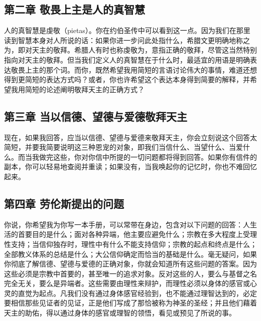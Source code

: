 
\subsection{第二章 敬畏上主是人的真智慧}

人的真智慧是虔敬（pietas）。你在约伯圣传中可以看到这一点。因为我们在那里读到智慧本身对人所说的话：如果你进一步问此处指什么，希腊文更明确地称之为，即对天主的敬拜。希腊人有时也称虔敬为，意指正确的敬拜，尽管这当然特别指向对天主的敬拜。但当我们定义人的真智慧在于什么时，最适宜的用语是明确表达敬畏上主的那个词。而你，既然希望我用简短的言语讨论伟大的事情，难道还想得到更简短的表达方式吗？或者，你也许希望这个表达本身得到简要的解释，并希望我用简短的论述阐明敬拜天主的正确方式？\par


\subsection{第三章 当以信德、望德与爱德敬拜天主}

现在，如果我回答，应当以信德、望德与爱德来敬拜天主，你会立刻说这个回答太简短，并要我简要说明这三种恩宠的对象，即我们当信什么、当望什么、当爱什么。而当我做完这些，你对你信中所提的一切问题都将得到回答。如果你有信件的副本，你可以轻易地查阅并重读；如果没有，当我唤起你的记忆时，你也不难回忆起来。\par


\subsection{第四章 劳伦斯提出的问题}

你说，你希望我为你写一本手册，可以常带在身边，包含对以下问题的回答：人生活的首要目的是什么；面对各种异端，他主要应避免什么；宗教在多大程度上受理性支持；当信仰独存时，理性中有什么不能支持信仰；宗教的起点和终点是什么；全部教义体系的总结是什么；大公信仰确定而恰当的基础是什么。毫无疑问，如果你彻底了解信德、望德与爱德的正确对象，你就会知道所有这些问题的答案。因为这些必须是宗教中首要的，甚至唯一的追求对象。反对这些的人，要么与基督之名完全无关，要么是异端者。这些需要由理性来辩护，而理性必须以身体的感官或心灵的直觉为起点。凡我们没有通过身体感官经验到，也不能通过理智达到的，必定要相信那些见证者的见证，正是他们写成了那恰被称为神圣的圣经；并且他们藉着天主的助佑，得以通过身体的感官或理智的领悟，看见或预见了所说的事。\par

